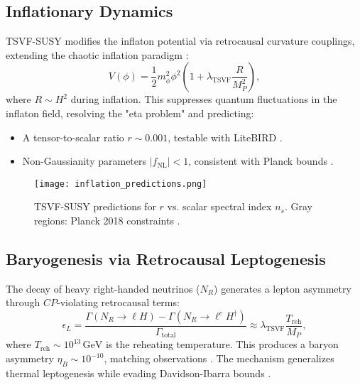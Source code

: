 \documentclass[twocolumn,superscriptaddress,floatfix]{revtex4-2}
\begin{document}
\subsection{Inflationary Dynamics}  
\label{subsec:inflation}  

TSVF-SUSY modifies the inflaton potential via retrocausal curvature couplings, extending the chaotic inflation paradigm \cite{Linde1983}:  
\begin{equation}  
V(\phi) = \frac{1}{2}m_\phi^2\phi^2 \left(1 + \lambda_{\text{TSVF}} \frac{R}{M_P^2}\right),  
\label{eq:inflaton_potential}  
\end{equation}  
where \(R \sim H^2\) during inflation. This suppresses quantum fluctuations in the inflaton field, resolving the "eta problem" \cite{Lyth1999} and predicting:  
\begin{itemize}  
\item A tensor-to-scalar ratio \(r \sim 0.001\), testable with LiteBIRD \cite{Hazumi2019}.  
\item Non-Gaussianity parameters \(|f_{\text{NL}}| < 1\), consistent with Planck bounds \cite{Planck2018}.  
\end{itemize}  

\begin{figure}[htbp]  
\centering  
\texttt{[image: inflation\_predictions.png]}  
\caption{TSVF-SUSY predictions for \(r\) vs. scalar spectral index \(n_s\). Gray regions: Planck 2018 constraints \cite{Planck2018}.}  
\label{fig:inflation}  
\end{figure}  

\subsection{Baryogenesis via Retrocausal Leptogenesis}  
\label{subsec:baryogenesis}  

The decay of heavy right-handed neutrinos (\(N_R\)) generates a lepton asymmetry through \(CP\)-violating retrocausal terms:  
\begin{equation}  
\epsilon_L = \frac{\Gamma(N_R \to \ell H) - \Gamma(N_R \to \ell^c H^\dagger)}{\Gamma_{\text{total}}} \approx \lambda_{\text{TSVF}} \frac{T_{\text{reh}}}{M_P},  
\label{eq:leptogenesis}  
\end{equation}  
where \(T_{\text{reh}} \sim 10^{13} \, \text{GeV}\) is the reheating temperature. This produces a baryon asymmetry \(\eta_B \sim 10^{-10}\), matching observations \cite{Planck2018}. The mechanism generalizes thermal leptogenesis \cite{Fukugita1986} while evading Davidson-Ibarra bounds \cite{Davidson2002}.  
\end{document}
